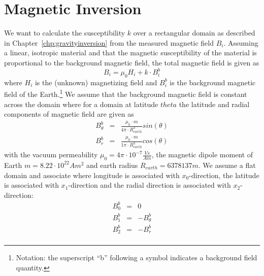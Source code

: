 
%
%
%


\section{Magnetic Inversion}\label{sec:forward magnetic}

We want to calculate the susceptibility $k$ over a rectangular domain as described in Chapter~\ref{chp:gravityinversion} from 
the measured magnetic field $B_i$. Assuming a linear, isotropic material and that the magnetic susceptibility of the material is proportional to the background magnetic field, the total magnetic field is 
given as 
\begin{equation}\label{EQU:Hb}
B_i = \mu_0 H_i + k \cdot B^b_i 
\end{equation}
where $H_i$ is the (unknown) magnetizing field and
$B^b_i$ is the background magnetic field of the Earth.\footnote{Notation: the superscript ``b'' following a symbol indicates 
a background field quantity.} We assume that the background  magnetic field is constant across the domain 
where for a domain at latitude $theta$ the latitude and radial components of magnetic field are given as  
\begin{equation}\label{EQU:Hb 2}
\begin{array}{rcl}
B^b_{\theta}  & = & \displaystyle{ \frac{\mu_0 \cdot m}{4 \pi \cdot R_{earth}^3} sin(\theta) }  \\
B^b_r & = & \displaystyle{ \frac{\mu_0 \cdot m}{1 \pi \cdot R_{earth}^3} cos(\theta) }
\end{array}
\end{equation}
with the vacuum permeability $\mu_0 = 4 \pi \cdot 10^{-7} \frac{Vs}{Am}$, 
the magnetic dipole moment of Earth $m= 8.22 \cdot 10^22 Am^2$ and earth radius $R_{earth}= 6378137m$. We assume a flat domain
and associate where longitude is associated with $x_0$-direction,
the latitude is associated with $x_1$-direction and the radial direction is associated with $x_2$-direction:
\begin{equation}\label{EQU:Hb 3}
\begin{array}{rcl}
B^b_0  & = & 0 \\
B^b_1  & = & -B^b_{\theta} \\
B^b_2  & = & -B^b_r \\
\end{array}
\end{equation}
